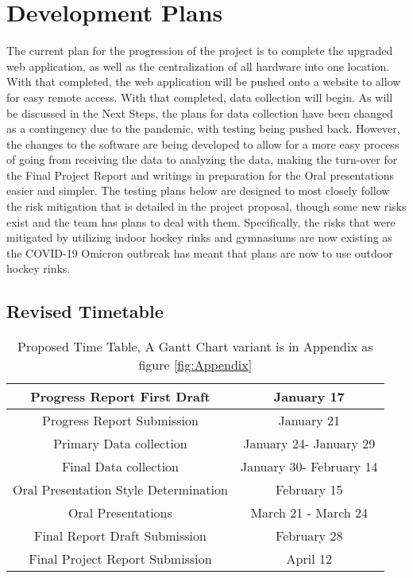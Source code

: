 \section{Development Plans}
The current plan for the progression of the project is to complete the upgraded web application, as well as the centralization of all hardware into one location. With that completed, the web application will be pushed onto a website to allow for easy remote access. With that completed, data collection will begin. As will be discussed in the Next Steps, the plans for data collection have been changed as a contingency due to the pandemic, with testing being pushed back. However, the changes to the software are being developed to allow for a more easy process of going from receiving the data to analyzing the data, making the turn-over for the Final Project Report and writings in preparation for the Oral presentations easier and simpler. The testing plans below are designed to most closely follow the risk mitigation that is detailed in the project proposal, though some new risks exist and the team has plans to deal with them. Specifically, the risks that were mitigated by utilizing indoor hockey rinks and gymnasiums are now existing as the COVID-19 Omicron outbreak has meant that plans are now to use outdoor hockey rinks.

\newpage
\subsection{Revised Timetable}

\begin{table}[ht]
\begin{center}
\begin{tabular}{|c|c|}
\hline
Progress Report First Draft &	January 17 \\ 
	\hline
Progress Report Submission &    January 21 \\ 
\hline
Primary Data collection &	January 24- January 29 \\ 
\hline
Final Data collection &	January 30- February 14 \\ 
\hline
Oral Presentation Style Determination &	February 15 \\ 
\hline
Oral Presentations &	March 21 - March 24 \\ 
\hline
Final Report Draft Submission &	February 28 \\ 
\hline
Final Project Report Submission &   April 12 \\ 
\hline
\hline
\end{tabular}
\caption{Proposed Time Table, A Gantt Chart variant is in Appendix as figure \ref{fig:Appendix}}
\label{table:1}
\end{center}
\end{table}
